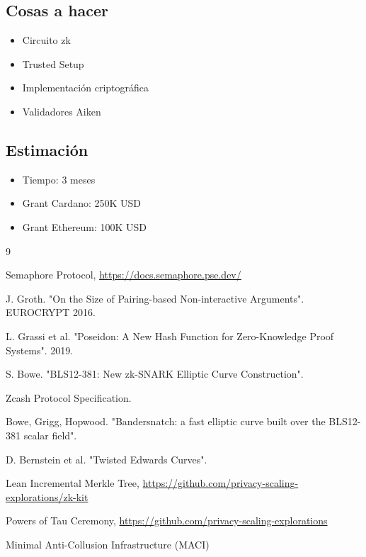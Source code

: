 \documentclass[11pt,a4paper]{article}
\begin{document}
	\subsection{Cosas a hacer}
	
	\begin{itemize}
		\item Circuito zk
		\item Trusted Setup
		\item Implementación criptográfica
		\item Validadores Aiken
	\end{itemize}
	
	\subsection{Estimación}
	
	\begin{itemize}
		\item Tiempo: 3 meses
		\item Grant Cardano: 250K USD
		\item Grant Ethereum: 100K USD
	\end{itemize}
	
	\begin{thebibliography}{9}
		
		Semaphore Protocol, \url{https://docs.semaphore.pse.dev/}
		
		J. Groth. "On the Size of Pairing-based Non-interactive Arguments". EUROCRYPT 2016.
		
		L. Grassi et al. "Poseidon: A New Hash Function for Zero-Knowledge Proof Systems". 2019.
		
		S. Bowe. "BLS12-381: New zk-SNARK Elliptic Curve Construction".
		
		Zcash Protocol Specification.
		
		Bowe, Grigg, Hopwood. "Bandersnatch: a fast elliptic curve built over the BLS12-381 scalar field".
		
		D. Bernstein et al. "Twisted Edwards Curves".
		
		Lean Incremental Merkle Tree, \url{https://github.com/privacy-scaling-explorations/zk-kit}
		
		Powers of Tau Ceremony, \url{https://github.com/privacy-scaling-explorations}
		
		Minimal Anti-Collusion Infrastructure (MACI)
		
	\end{thebibliography}
	
\end{document}
